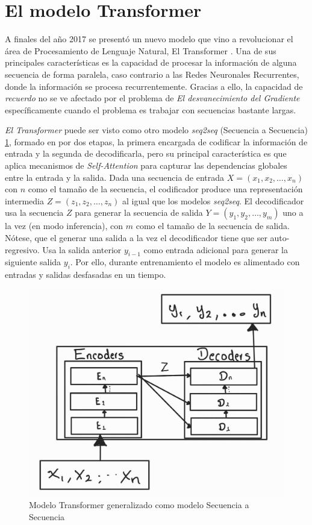 \section{El modelo Transformer}

A finales del año 2017 se presentó un nuevo modelo que vino a revolucionar el área de Procesamiento
de Lenguaje Natural, El Transformer \cite{Vaswani}. Una de sus principales características es la
capacidad de procesar la información de alguna secuencia de forma paralela, caso contrario a las
Redes Neuronales Recurrentes, donde la información se procesa recurrentemente. Gracias a ello,
la capacidad de \textit{recuerdo} no se ve afectado por el problema de \textit{El desvanecimiento
del Gradiente} específicamente cuando el problema es trabajar con secuencias  bastante largas.

\textit{El Transformer} puede ser visto como otro modelo \textit{seq2seq} (Secuencia a Secuencia)
\ref{fig:trans_seq2sqe}, formado en por dos etapas, la primera encargada de codificar la información de entrada
y la segunda de decodificarla, pero su principal característica es que aplica mecanismos de
\textit{Self-Attention} para capturar las dependencias globales entre la entrada y la salida. Dada
una secuencia de entrada $X = (x_1, x_2, \dots, x_n )$ con $n$ como el tamaño de la secuencia,
el codificador produce una representación intermedia
$Z = (z_1, z_2, \dots, z_n)$ al igual que los modelos \textit{seq2seq}. El decodificador usa la
secuencia $Z$ para generar la secuencia de salida
$Y = (y_1, y_2, \dots, y_m)$ uno a la vez (en modo inferencia), con $m$ como el tamaño de la
secuencia de salida. Nótese, que el generar una salida a la vez el decodificador tiene que ser auto-regresivo.
Usa la salida anterior $y_{i-1}$ como entrada adicional para generar la siguiente salida $y_i$. Por
ello, durante entrenamiento el modelo es alimentado con entradas y salidas desfasadas en un tiempo.

\begin{figure}[ht!]
    \centering
    \includegraphics[width=0.4 \textwidth]{Chapters/1. Transformer/Figures/transformer/t_seq2seq.jpg}
    \caption{Modelo Transformer generalizado como modelo Secuencia a Secuencia}
    \label{fig:trans_seq2sqe}
\end{figure}


